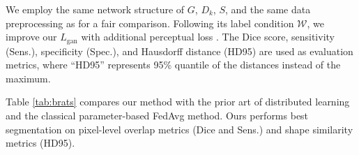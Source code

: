 \documentclass[letterpaper]{article} %
\newcommand{\domw}{\mathcal{W}}
\begin{document}
We employ the same network structure of $G$, $D_k$, $S$, and the same data preprocessing as \cite{chang2020synthetic} for a fair comparison. Following its label condition $\domw$, we improve our $L_\text{gan}$ with additional perceptual loss \cite{johnson2016perceptual}.
The Dice score, sensitivity (Sens.), specificity (Spec.), and Hausdorff distance (HD95) are used as evaluation metrics, where ``HD95'' represents 95\% quantile of the distances instead of the maximum.


Table \ref{tab:brats} compares our method with the prior art of distributed learning \cite{chang2020synthetic} and the classical parameter-based FedAvg method. Ours performs best segmentation on pixel-level overlap metrics (Dice and Sens.) and shape similarity metrics (HD95).
\end{document}
